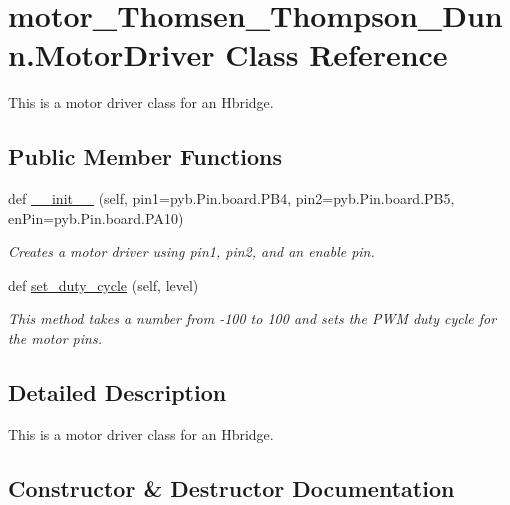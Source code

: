 \hypertarget{classmotor__Thomsen__Thompson__Dunn_1_1MotorDriver}{}\section{motor\+\_\+\+Thomsen\+\_\+\+Thompson\+\_\+\+Dunn.\+Motor\+Driver Class Reference}
\label{classmotor__Thomsen__Thompson__Dunn_1_1MotorDriver}


This is a motor driver class for an Hbridge.  


\subsection*{Public Member Functions}
\begin{DoxyCompactItemize}
\item 
def \hyperlink{classmotor__Thomsen__Thompson__Dunn_1_1MotorDriver_a63f1c9925d8c0532d96a422ebbc11f0e}{\+\_\+\+\_\+init\+\_\+\+\_\+} (self, pin1=pyb.\+Pin.\+board.\+P\+B4, pin2=pyb.\+Pin.\+board.\+P\+B5, en\+Pin=pyb.\+Pin.\+board.\+P\+A10)
\begin{DoxyCompactList}\small\item\em Creates a motor driver using pin1, pin2, and an enable pin. \end{DoxyCompactList}\item 
def \hyperlink{classmotor__Thomsen__Thompson__Dunn_1_1MotorDriver_adac6b45d109a119263b139ee5ebb4b7c}{set\+\_\+duty\+\_\+cycle} (self, level)\hypertarget{classmotor__Thomsen__Thompson__Dunn_1_1MotorDriver_adac6b45d109a119263b139ee5ebb4b7c}{}\label{classmotor__Thomsen__Thompson__Dunn_1_1MotorDriver_adac6b45d109a119263b139ee5ebb4b7c}

\begin{DoxyCompactList}\small\item\em This method takes a number from -\/100 to 100 and sets the P\+WM duty cycle for the motor pins. \end{DoxyCompactList}\end{DoxyCompactItemize}


\subsection{Detailed Description}
This is a motor driver class for an Hbridge. 

\subsection{Constructor \& Destructor Documentation}
